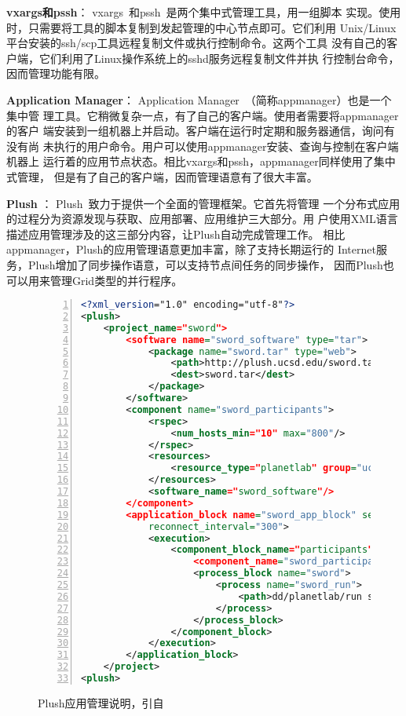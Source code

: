
\textbf{vxargs和pssh}：
vxargs~\cite{vxargs}和pssh~\cite{pssh}是两个集中式管理工具，用一组脚本
实现。使用时，只需要将工具的脚本复制到发起管理的中心节点即可。它们利用
Unix/Linux平台安装的ssh/scp工具远程复制文件或执行控制命令。这两个工具
没有自己的客户端，它们利用了Linux操作系统上的sshd服务远程复制文件并执
行控制台命令，因而管理功能有限。

\textbf{Application Manager}：
Application Manager~\cite{appmanager}（简称appmanager）也是一个集中管
理工具。它稍微复杂一点，有了自己的客户端。使用者需要将appmanager的客户
端安装到一组机器上并启动。客户端在运行时定期和服务器通信，询问有没有尚
未执行的用户命令。用户可以使用appmanager安装、查询与控制在客户端机器上
运行着的应用节点状态。相比vxargs和pssh，appmanager同样使用了集中式管理，
但是有了自己的客户端，因而管理语意有了很大丰富。

\textbf{Plush} ：
Plush~\cite{plush}致力于提供一个全面的管理框架。它首先将管理
一个分布式应用的过程分为资源发现与获取、应用部署、应用维护三大部分。用
户使用XML语言描述应用管理涉及的这三部分内容，让Plush自动完成管理工作。
相比appmanager，Plush的应用管理语意更加丰富，除了支持长期运行的
Internet服务，Plush增加了同步操作语意，可以支持节点间任务的同步操作，
因而Plush也可以用来管理Grid类型的并行程序。

\begin{figure}
\centering
\begin{lstlisting}[language=XML,numbers=left]
<?xml_version="1.0" encoding="utf-8"?>
<plush>
    <project_name="sword">
        <software name="sword_software" type="tar">
            <package name="sword.tar" type="web">
                <path>http://plush.ucsd.edu/sword.tar</path>
                <dest>sword.tar</dest>
            </package>
        </software>
        <component name="sword_participants">
            <rspec>
                <num_hosts_min="10" max="800"/>
            </rspec>
            <resources>
                <resource_type="planetlab" group="ucsd_sword"/>
            </resources>
            <software_name="sword_software"/>
        </component>
        <application_block name="sword_app_block" service="1"
            reconnect_interval="300">
            <execution>
                <component_block_name="participants">
                    <component_name="sword_participants"/>
                    <process_block name="sword">
                        <process name="sword_run">
                            <path>dd/planetlab/run sword</path>
                        </process>
                    </process_block>
                </component_block>
            </execution>
        </application_block>
    </project>
<plush>
\end{lstlisting}
\caption{Plush应用管理说明，引自~\cite{plush}}
\label{fig:plush_spec}
\end{figure}


